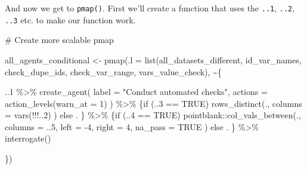 \documentclass[
  letterpaper,
  DIV=11,
  numbers=noendperiod]{scrreprt}
\newenvironment{Shaded}{\begin{snugshade}}{\end{snugshade}}
\newcommand{\AttributeTok}[1]{\textcolor[rgb]{0.40,0.45,0.13}{#1}}
\newcommand{\CommentTok}[1]{\textcolor[rgb]{0.37,0.37,0.37}{#1}}
\newcommand{\ConstantTok}[1]{\textcolor[rgb]{0.56,0.35,0.01}{#1}}
\newcommand{\ControlFlowTok}[1]{\textcolor[rgb]{0.00,0.23,0.31}{#1}}
\newcommand{\DecValTok}[1]{\textcolor[rgb]{0.68,0.00,0.00}{#1}}
\newcommand{\FunctionTok}[1]{\textcolor[rgb]{0.28,0.35,0.67}{#1}}
\newcommand{\NormalTok}[1]{\textcolor[rgb]{0.00,0.23,0.31}{#1}}
\newcommand{\OtherTok}[1]{\textcolor[rgb]{0.00,0.23,0.31}{#1}}
\newcommand{\SpecialCharTok}[1]{\textcolor[rgb]{0.37,0.37,0.37}{#1}}
\newcommand{\StringTok}[1]{\textcolor[rgb]{0.13,0.47,0.30}{#1}}
\begin{document}
And now we get to \texttt{pmap()}. First we'll create a function that
uses the \texttt{..1}, \texttt{..2}, \texttt{..3} etc. to make our
function work.

\begin{Shaded}
\begin{Highlighting}[]
\CommentTok{\# Create more scalable pmap}

\NormalTok{all\_agents\_conditional }\OtherTok{\textless{}{-}} \FunctionTok{pmap}\NormalTok{(}\AttributeTok{.l =} \FunctionTok{list}\NormalTok{(all\_datasets\_different, }
\NormalTok{                                         id\_var\_names, }
\NormalTok{                                         check\_dupe\_ids,}
\NormalTok{                                         check\_var\_range,}
\NormalTok{                                         vars\_value\_check),}
                               \SpecialCharTok{\textasciitilde{}}\NormalTok{\{}
    
\NormalTok{    ..}\DecValTok{1} \SpecialCharTok{\%\textgreater{}\%}
      \FunctionTok{create\_agent}\NormalTok{(}
        \AttributeTok{label =} \StringTok{"Conduct automated checks"}\NormalTok{,}
        \AttributeTok{actions =} \FunctionTok{action\_levels}\NormalTok{(}\AttributeTok{warn\_at =} \DecValTok{1}\NormalTok{)}
\NormalTok{      ) }\SpecialCharTok{\%\textgreater{}\%}
\NormalTok{      \{}\ControlFlowTok{if}\NormalTok{ (..}\DecValTok{3} \SpecialCharTok{==} \ConstantTok{TRUE}\NormalTok{)}
        \FunctionTok{rows\_distinct}\NormalTok{(.,}
          \AttributeTok{columns =} \FunctionTok{vars}\NormalTok{(}\SpecialCharTok{!!!}\NormalTok{..}\DecValTok{2}\NormalTok{)}
\NormalTok{          )}
        \ControlFlowTok{else}\NormalTok{ .}
\NormalTok{        \} }\SpecialCharTok{\%\textgreater{}\%}
\NormalTok{      \{}\ControlFlowTok{if}\NormalTok{ (..}\DecValTok{4} \SpecialCharTok{==} \ConstantTok{TRUE}\NormalTok{)}
\NormalTok{        pointblank}\SpecialCharTok{::}\FunctionTok{col\_vals\_between}\NormalTok{(.,}
          \AttributeTok{columns =}\NormalTok{ ..}\DecValTok{5}\NormalTok{,}
          \AttributeTok{left =} \SpecialCharTok{{-}}\DecValTok{4}\NormalTok{,}
          \AttributeTok{right =} \DecValTok{4}\NormalTok{,}
          \AttributeTok{na\_pass =} \ConstantTok{TRUE}
\NormalTok{        )}
        \ControlFlowTok{else}\NormalTok{ .}
\NormalTok{        \} }\SpecialCharTok{\%\textgreater{}\%} 
      \FunctionTok{interrogate}\NormalTok{()}

  
\NormalTok{\})}
\end{Highlighting}
\end{Shaded}
\end{document}
